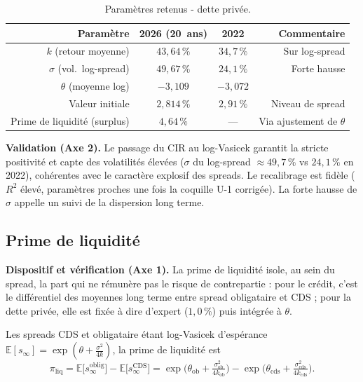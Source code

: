 \documentclass[11pt,a4paper]{article}
\renewcommand{\arraystretch}{1.4}
\newcommand{\tablehead}[1]{\textcolor{nxnavy}{\sffamily\bfseries\small #1}}
\begin{document}
\begin{table}[H]
\centering\small
\renewcommand{\arraystretch}{1.4}\setlength{\tabcolsep}{6pt}
\begin{tabularx}{\linewidth}{R C C R}
\toprule
\tablehead{Paramètre} & \tablehead{2026 (20~ans)} & \tablehead{2022} & \tablehead{Commentaire} \\
\midrule
{} $k$ (retour moyenne) & $43{,}64\,\%$ & $34{,}7\,\%$ & Sur log-spread \\
$\sigma$ (vol.\ log-spread) & $49{,}67\,\%$ & $24{,}1\,\%$ & Forte hausse \\
 $\theta$ (moyenne log) & $-3{,}109$ & $-3{,}072$ & \\
Valeur initiale & $2{,}814\,\%$ & $2{,}91\,\%$ & Niveau de spread \\
 Prime de liquidité (surplus) & $4{,}64\,\%$ & --- & Via ajustement de $\theta$ \\
\bottomrule
\end{tabularx}
\caption{Paramètres retenus - dette privée.}
\end{table}

\textbf{Validation (Axe 2).} Le passage du CIR au log-Vasicek garantit la stricte positivité et capte des volatilités élevées ($\sigma$ du log-spread $\approx49{,}7\,\%$ vs $24{,}1\,\%$ en 2022), cohérentes avec le caractère explosif des spreads. Le recalibrage est fidèle ($R^2$ élevé, paramètres proches une fois la coquille U-1 corrigée). La forte hausse de $\sigma$ appelle un suivi de la dispersion long terme.

\subsection{Prime de liquidité}
\label{sec:liqui}

\textbf{Dispositif et vérification (Axe 1).} La prime de liquidité isole, au sein du spread, la part qui ne rémunère pas le risque de contrepartie : pour le crédit, c'est le différentiel des moyennes long terme entre spread obligataire et CDS ; pour la dette privée, elle est fixée à dire d'expert ($1{,}0\,\%$) puis intégrée à $\theta$.
\begin{definitionbox}
Les spreads CDS et obligataire étant log-Vasicek d'espérance $\mathbb E[s_\infty]=\exp(\theta+\tfrac{\sigma^2}{4k})$, la prime de liquidité est
\[
\pi_{\mathrm{liq}}=\mathbb E\big[s^{\mathrm{oblig}}_\infty\big]-\mathbb E\big[s^{\mathrm{CDS}}_\infty\big]
=\exp\!\Big(\theta_{\mathrm{ob}}+\tfrac{\sigma_{\mathrm{ob}}^2}{4k_{\mathrm{ob}}}\Big)-\exp\!\Big(\theta_{\mathrm{cds}}+\tfrac{\sigma_{\mathrm{cds}}^2}{4k_{\mathrm{cds}}}\Big).
\]
\end{definitionbox}
\end{document}
